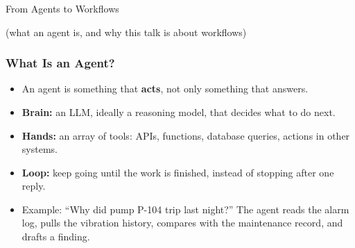 
\begin{frame}[fragile]\frametitle{}
\begin{center}
{\Large From Agents to Workflows}

\medskip
{\small (what an agent is, and why this talk is about workflows)}
\end{center}
\end{frame}

\begin{frame}[fragile]\frametitle{What Is an Agent?}
\begin{itemize}
\item An agent is something that \textbf{acts}, not only something that answers.
\item \textbf{Brain:} an LLM, ideally a reasoning model, that decides what to do next.
\item \textbf{Hands:} an array of tools: APIs, functions, database queries, actions in other systems.
\item \textbf{Loop:} keep going until the work is finished, instead of stopping after one reply.
\item Example: ``Why did pump P-104 trip last night?'' The agent reads the alarm log, pulls the vibration history, compares with the maintenance record, and drafts a finding.
\end{itemize}
\end{frame}


